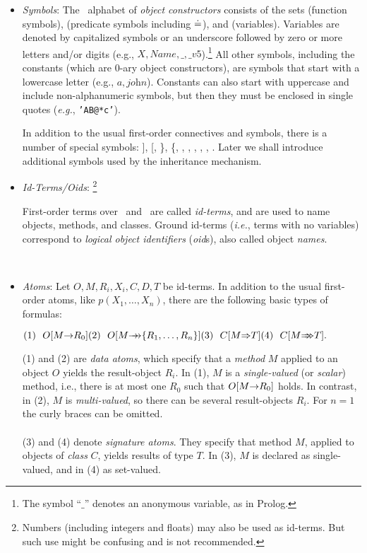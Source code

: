 \documentclass[11pt]{report}
\begin{document}
\begin{itemize}
\item \emph{Symbols}: The \fl\ alphabet of \emph{object constructors}
  consists of the sets \funcs (function symbols), \preds (predicate symbols
  including $\doteq$), and \vars (variables).  Variables are denoted by
  capitalized symbols or an underscore followed by zero or more letters
  and/or digits (e.g., $X,\textit{Name}, \_, \_v5$).\footnote{
    The symbol ``$\_$'' denotes an anonymous variable, as in Prolog.
    }
  All other symbols, including the constants (which are 0-ary object
  constructors), are symbols that start with a lowercase letter (e.g., $a,
  \textit{john}$). Constants can also start with uppercase and include
  non-alphanumeric symbols, but then they must be enclosed in single
  quotes ({\it e.g.}, {\tt 'AB@*c'}). 
  
  In addition to the usual first-order connectives and symbols,
  there is a number of special symbols: ], [, \}, \{, \fd, \mvd, \Fd,
  \Mvd,
  \isa, \subcl. Later we shall introduce additional symbols used by the
  inheritance mechanism.
\item \emph{Id-Terms/Oids}:%
\footnote{
    Numbers (including integers and floats) may also be used as id-terms. But
    such use might be confusing and is not recommended.
    }
\medskip
  
  \begin{minipage}[t]{.80\textwidth}
    First-order terms over \funcs\ and \vars\ are called \emph{id-terms},
    and are used to name objects, methods, and classes.  Ground id-terms
    ({\it i.e.}, terms with no variables) correspond to \emph{logical
      object identifiers} (\emph{oid}s), also called object \emph{names}.
  \end{minipage}
  \hfill ~
\item \emph{Atoms}: Let $O,M,R_{i},X_{i},C,D,T$ be id-terms.  In
  addition to the usual first-order atoms, like $p(X_1,\dots,X_n)$, there
  are the following basic types of formulas: \medskip

  \begin{math}
    \hfill (1)~~O[M\fd R_0] \hfill (2)~~O[M\mvd \{R_1,\dots,R_n\}]
    \hfill (3)~~C[M\Fd T] \hfill (4)~~C[M\Mvd T]. \hfill
  \end{math} \medskip
  
  (1) and (2) are \emph{data atoms}, which specify that a \emph{method} $M$
  applied to an object $O$ yields the result-object $R_i$. In (1), $M$ is a
  \emph{single-valued} (or \emph{scalar}) method, i.e., there is
  at most one $R_0$ such that $O[M{\rightarrow} R_0]$ holds. In contrast, in
  (2), $M$ is \emph{multi-valued}, so there can be several result-objects
  $R_i$. For $n=1$ the curly braces can be omitted.\\ 
  \\
  (3) and (4) denote \emph{signature atoms}. They specify that method $M$,
  applied to objects of \emph{class} $C$, yields results of type $T$.
  In (3), $M$ is declared as single-valued, and in (4) as set-valued.
  

\end{itemize}
\end{document}
